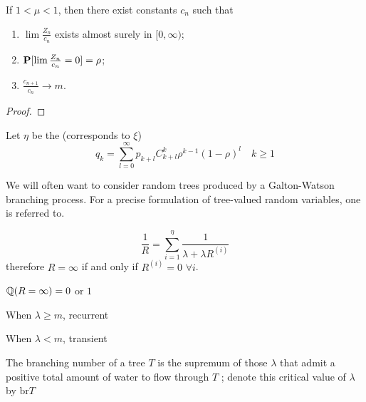\begin{theorem}
    If \(1 < \mu < 1\), then there exist constants \(c_n\) such that
    \begin{enumerate}[label=(\roman*)]
        \item \(\lim \frac{Z_n}{c_n}\) exists almost surely in \([0, \infty)\);
        \item \(\mathbf{P}[\lim \frac{Z_n}{c_n} = 0] = \rho\);
        \item \(\frac{c_{n+1}}{c_n} \to m\).
    \end{enumerate}

\end{theorem}
\begin{proof}
    
\end{proof}

Let $\eta$ be the (corresponds to $\xi$)
\[q_k=\sum_{l=0}^{\infty} p_{k+l} C_{k+l}^k \rho^{k-1}(1-\rho)^l \quad k\geq 1 \]

We will often want to consider random trees produced by a Galton-Watson branching
process. For a precise formulation of tree-valued random variables, one is referred to.

\[\frac{1}{R}=\sum_{i=1}^{\eta}\frac{1}{\lambda+\lambda R^{(i)}}\]
therefore $R=\infty$ if and only if $R^{(i)}=0$ $\forall i$.

\begin{lemma}[0-1 law]
    $\mathbb{Q}(R=\infty)=0$ or $1$
\end{lemma}

\begin{theorem}
    When $\lambda\geq m$, recurrent
\end{theorem}



\begin{theorem}
    When $\lambda<m$, transient
\end{theorem}

\begin{example}[3-1 tree]
    
\end{example}

\begin{definition}
    The branching number of a tree $T$ is
the supremum of those $\lambda$ that admit a positive total amount of water to flow through $T$ ;
denote this critical value of $\lambda$ by $\text{br} T$
\end{definition}


